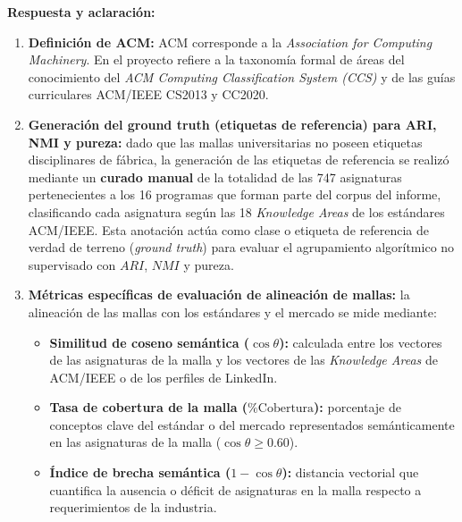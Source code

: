 \vspace{0.2cm}

\noindent
\textbf{Respuesta y aclaración:}
\begin{enumerate}[leftmargin=*]
	\item \textbf{Definición de ACM:} ACM corresponde a la \textit{Association for Computing Machinery}. En el proyecto refiere a la taxonomía formal de áreas del conocimiento del \textit{ACM Computing Classification System (CCS)} y de las guías curriculares ACM/IEEE CS2013 y CC2020.
	\item \textbf{Generación del ground truth (etiquetas de referencia) para ARI, NMI y pureza:}
	      dado que las mallas universitarias no poseen etiquetas disciplinares de fábrica, la generación de las etiquetas de referencia se realizó mediante un \textbf{curado manual} de la totalidad de las 747 asignaturas pertenecientes a los 16 programas que forman parte del corpus del informe, clasificando cada asignatura según las 18 \textit{Knowledge Areas} de los estándares ACM/IEEE. Esta anotación actúa como clase o etiqueta de referencia de verdad de terreno (\textit{ground truth}) para evaluar el agrupamiento algorítmico no supervisado con $ARI$, $NMI$ y pureza.
	\item \textbf{Métricas específicas de evaluación de alineación de mallas:}
	      la alineación de las mallas con los estándares y el mercado se mide mediante:
	      \begin{itemize}
		      \item \textbf{Similitud de coseno semántica ($\cos \theta$):} calculada entre los vectores de las asignaturas de la malla y los vectores de las \textit{Knowledge Areas} de ACM/IEEE o de los perfiles de LinkedIn.
		      \item \textbf{Tasa de cobertura de la malla ($\% \text{Cobertura}$):} porcentaje de conceptos clave del estándar o del mercado representados semánticamente en las asignaturas de la malla ($\cos \theta \ge 0.60$).
		      \item \textbf{Índice de brecha semántica ($1 - \cos \theta$):} distancia vectorial que cuantifica la ausencia o déficit de asignaturas en la malla respecto a requerimientos de la industria.
	      \end{itemize}
\end{enumerate}

\vspace{0.4cm}

